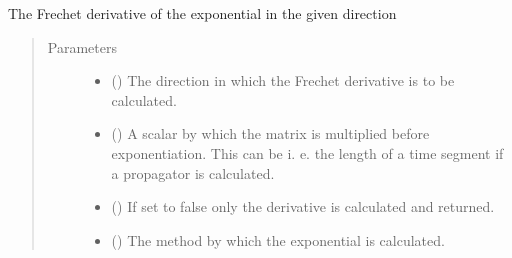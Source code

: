 \documentclass[letterpaper,10pt,english]{sphinxmanual}
\begin{document}
\begin{fulllineitems}
\begin{fulllineitems}
\label{\detokenize{qsim:qsim.matrix.OperatorMatrix.dexp}}
The Frechet derivative of the exponential in the given direction
\begin{quote}\begin{description}
\item[{Parameters}] \leavevmode\begin{itemize}
\item {} 
 ({\hyperref[\detokenize{qsim:qsim.matrix.OperatorMatrix}]{}}) \textendash{} The direction in which the Frechet derivative is to be calculated.

\item {} 
 () \textendash{} A scalar by which the matrix is multiplied before exponentiation.
This can be i. e. the length of a time segment if a propagator is
calculated.

\item {} 
 () \textendash{} If set to false only the derivative is calculated and returned.

\item {} 
 (\sphinxstyleliteralemphasis{\sphinxupquote{{[}}}\sphinxstyleliteralemphasis{\sphinxupquote{{]}}}) \textendash{} The method by which the exponential is calculated.


\end{itemize}
\end{description}
\end{quote}
\end{fulllineitems}
\end{fulllineitems}
\end{document}
